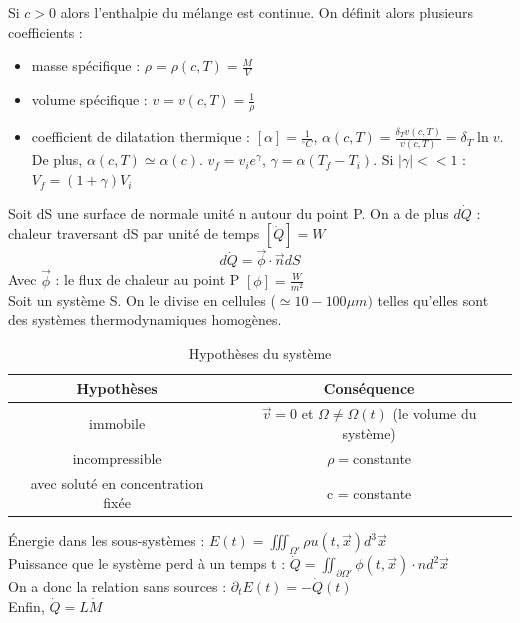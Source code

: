 \documentclass[../main.tex]{subfiles}
\begin{document}
Si $c>0$ alors l'enthalpie du mélange est continue. On définit alors plusieurs coefficients :\\
\begin{itemize}
    \item masse spécifique : $\rho = \rho(c,T) = \frac{M}{V}$\\
    \item volume spécifique : $v = v(c,T) = \frac{1}{\rho}$\\
    \item coefficient de dilatation thermique : $[\alpha] = \frac{1}{^\circ C}$, $\alpha(c,T) = \frac{\delta_T v(c,T)}{v(c,T)} = \delta_T \ln{v}$. De plus, $\alpha(c,T) \simeq \alpha(c)$. $v_f = v_i e^\gamma$, $\gamma = \alpha(T_f-T_i)$. Si $\lvert \gamma \rvert<<1$ : $V_f = (1+\gamma)V_i$\\
\end{itemize}

Soit dS une surface de normale unité n autour du point P. On a de plus $d\dot{Q}$ : chaleur traversant dS par unité de temps $[\dot{Q}] = W$\\
\begin{equation}
    d\dot{Q} = \Vec{\phi} \cdot \Vec{n} dS
\end{equation}
Avec $\Vec{\phi}$ : le flux de chaleur au point P $[\phi] = \frac{W}{m^2}$\\
Soit un système S. On le divise en cellules ($\simeq 10-100\mu m)$ telles qu'elles sont des systèmes thermodynamiques homogènes.\\
\begin{table}[hbt!]
    \centering
    \begin{tabular}{c|c}
        Hypothèses & Conséquence \\
        \hline
        immobile & $\Vec{v} = 0$ et $\Omega\neq \Omega(t)$ (le volume du système)\\
        incompressible & $\rho =$constante\\
        avec soluté en concentration fixée & c = constante\\
    \end{tabular}
    \caption{Hypothèses du système}
\end{table}

Énergie dans les sous-systèmes : $E(t) = \iiint_{\Omega'} \rho u(t,\Vec{x}) d^3\Vec{x}$\\
Puissance que le système perd à un temps t : $\dot{Q} = \iint_{\partial \Omega'} \phi(t,\Vec{x}) \cdot n d^2 \Vec{x}$\\
On a donc la relation sans sources : $\partial_t E(t) = -\dot{Q}(t)$\\
Enfin, $\dot{Q} = L \dot{M}$\\
\end{document}
